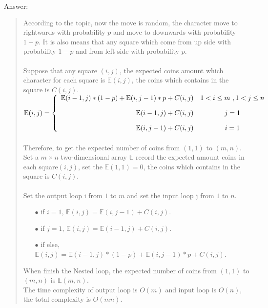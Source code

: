 \documentclass{article}
\begin{document}
\begin{Question}
\begin{Subquestion}
\begin{answer}
Answer:
\begin{quote}
    According to the topic, now the move is random, the character move to rightwards with probability $p$ and move to downwards with probability $1-p$. It is also means that any square which come from up side with probability $1-p$ and from left side with probability $p$.\\\\
    Suppose that any square $(i, j)$, the expected coins amount which character for each square is $\mathbb{E} (i, j)$, the coins which contains in the square is $C(i, j)$.\vspace{1em}\\
    $\mathbb{E}(i, j) = \left\{
        \begin{array}{rcl}
            \mathbb{E}(i-1, j) * (1-p) + \mathbb{E}(i, j-1) * p + C(i, j) & 1 < i \leq m\ , 1 < j \leq n \vspace{1em}\\
            \mathbb{E}(i-1, j) + C(i, j) & j = 1\vspace{1em}\\
            \mathbb{E}(i, j-1) + C(i, j) & i = 1\\
        \end{array}
    \right.$
    \\\\Therefore, to get the expected number of coins from $(1,1)$ to $(m, n)$. Set a  $m \times n$ two-dimensional array $\mathbb{E}$ record the expected amount coins in each square$(i, j)$, set the $\mathbb{E}(1, 1) = 0$, the coins which contains in the square is $C(i, j)$.\\\\
    Set the output loop i from $1$ to $m$ and set the input loop j from $1$ to $n$.
    \begin{itemize}
        \item [$\bullet$] if $i = 1$, $\mathbb{E}(i, j) = \mathbb{E}(i, j-1) + C(i, j)$.
        \item [$\bullet$] if $j = 1$, $\mathbb{E}(i, j) = \mathbb{E}(i-1, j) + C(i, j)$.
        \item [$\bullet$] if else, $\mathbb{E}(i, j) = \mathbb{E}(i-1, j) * (1-p) + \mathbb{E}(i, j-1) * p + C(i, j)$.\vspace{1em}
    \end{itemize}
    When finish the Nested loop, the expected number of coins from $(1, 1)$ to $(m, n)$ is $\mathbb{E}(m, n)$.\vspace{1em}\\
    The time complexity of output loop is $O(m)$ and input loop is $O(n)$, the total complexity is $O(mn)$.\\
\end{quote}
\end{answer}
\end{Subquestion}
\end{Question}
\end{document}
